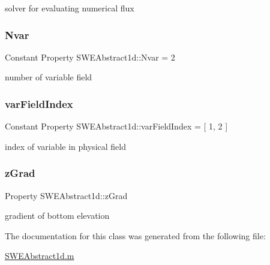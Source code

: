 solver for evaluating numerical flux 

\mbox{\label{class_s_w_e_abstract1d_ace93a7188e7ce1fba217097fd870a04a}} 
\subsubsection{\texorpdfstring{Nvar}{Nvar}}
{\footnotesize\ttfamily Constant Property S\+W\+E\+Abstract1d\+::\+Nvar = 2}



number of variable field 

\mbox{\label{class_s_w_e_abstract1d_acc388ba4a119a6652be1457d66216597}} 
\subsubsection{\texorpdfstring{var\+Field\+Index}{varFieldIndex}}
{\footnotesize\ttfamily Constant Property S\+W\+E\+Abstract1d\+::var\+Field\+Index = \mbox{[} 1, 2 \mbox{]}}



index of variable in physical field 

\mbox{\label{class_s_w_e_abstract1d_a97b5ea254872da78a8762002b657a984}} 
\subsubsection{\texorpdfstring{z\+Grad}{zGrad}}
{\footnotesize\ttfamily Property S\+W\+E\+Abstract1d\+::z\+Grad}



gradient of bottom elevation 



The documentation for this class was generated from the following file\+:\begin{DoxyCompactItemize}
\item 
\hyperlink{_s_w_e_abstract1d_8m}{S\+W\+E\+Abstract1d.\+m}\end{DoxyCompactItemize}
